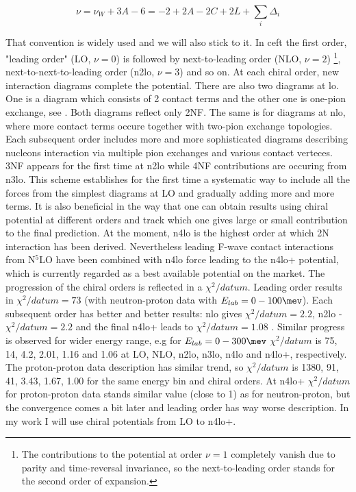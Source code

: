 \begin{equation}
    \nu = \nu_W + 3A  - 6 = -2 + 2A - 2C + 2L + \sum_i \Delta_i
    \label{powers_corrected}
\end{equation}

That convention is widely used and we will also stick to it.
In \gls{ceft} the first order, "leading order" (LO, $\nu=0$) is followed 
by next-to-leading order (NLO, $\nu=2$)
\footnote{The contributions to the potential at order $\nu=1$ completely vanish due to parity and time-reversal invariance,
so the next-to-leading order stands for the second order of expansion.},
 next-to-next-to-leading order (\gls{n2lo}, $\nu=3$) and so on.
 At each chiral order, new interaction diagrams complete the potential.
 There are also two diagrams at \gls{lo}. One is a diagram which consists of 2 contact terms and the other one
 is one-pion exchange, see . Both diagrams reflect only 2NF.
 The same is for diagrams at \gls{nlo}, where more contact terms occure together with two-pion 
 exchange topologies. Each subsequent order includes more and more sophisticated diagrams
 describing nucleons interaction
 via multiple  pion exchanges and various contact verteces.
 3NF appears for the first time at \gls{n2lo} while 4NF contributions are occuring from \gls{n3lo}.
 This scheme establishes for the first time a systematic
way to include all the forces from the simplest diagrams at LO and gradually
adding more and more terms. 
It is also beneficial in the way that 
one can obtain results using chiral potential at different
orders and track which one gives large or small contribution to the final prediction.
At the moment, \gls{n4lo} is the highest order at which 2N interaction has been derived.
Nevertheless leading F-wave contact interactions from N$^5$LO have been combined with \gls{n4lo} force
leading to the \gls{n4lo+} potential,
which is currently regarded as a best available potential on the market.
The progression of the chiral orders is reflected in a $\chi^2/datum$.
Leading order results in $\chi^2/datum = 73$ (with neutron-proton data with $E_{lab} = 0-100 \unit{\mev}$).
Each subsequent order has better and better results: \gls{nlo} gives $\chi^2/datum = 2.2$, \gls{n2lo} - $\chi^2/datum = 2.2$
and the final \gls{n4lo+} leads to $\chi^2/datum = 1.08$ \cite{reinkrebs2018}.
Similar progress is observed for wider energy range, e.g for $E_{lab} = 0-300 \unit{\mev}$
$\chi^2/datum$ is 75, 14, 4.2, 2.01, 1.16 and 1.06
at LO, NLO, \gls{n2lo}, \gls{n3lo}, \gls{n4lo} and \gls{n4lo+}, respectively.
The proton-proton data description has similar trend, so $\chi^2/datum$ is 1380, 91, 41, 3.43, 1.67, 1.00 
for the same energy bin and chiral orders. At \gls{n4lo+} $\chi^2/datum$ for proton-proton data
stands similar value (close to 1) as for neutron-proton, but the convergence comes a bit later and 
leading order has way worse description.
In my work I will use chiral potentials from LO to \gls{n4lo+}.

